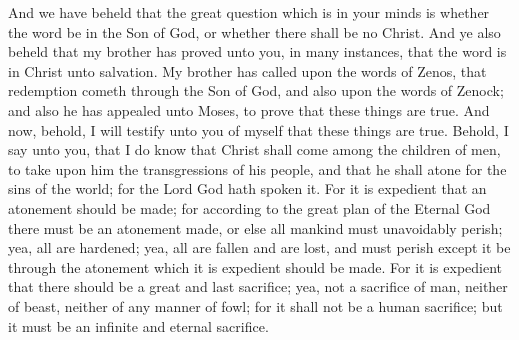 And we have beheld that the great question which is in your minds is whether the word be in the Son of God, or whether there shall be no Christ.
\bverse \iffalse And ye also beheld that my brother has proved unto you, in many instances, that the word is in Christ unto salvation. \fi
And ye also beheld that my brother has proved unto you, in many instances, that the word is in Christ unto salvation.
\bverse \iffalse My brother has called upon the words of Zenos, that redemption cometh through the Son of God, and also upon the words of Zenock; and also he has appealed unto Moses, to prove that these things are true. \fi
My brother has called upon the words of Zenos, that redemption cometh through the Son of God, and also upon the words of Zenock; and also he has appealed unto Moses, to prove that these things are true.
\bverse \iffalse And now, behold, I will testify unto you of myself that these things are true. Behold, I say unto you, that I do know that Christ shall come among the children of men, to take upon him the transgressions of his people, and that he shall atone for the sins of the world; for the Lord God hath spoken it. \fi
And now, behold, I will testify unto you of myself that these things are true. Behold, I say unto you, that I do know that Christ shall come among the children of men, to take upon him the transgressions of his people, and that he shall atone for the sins of the world; for the Lord God hath spoken it.
\bverse \iffalse For it is expedient that an atonement should be made; for according to the great plan of the Eternal God there must be an atonement made, or else all mankind must unavoidably perish; yea, all are hardened; yea, all are fallen and are lost, and must perish except it be through the atonement which it is expedient should be made. \fi
For it is expedient that an atonement should be made; for according to the great plan of the Eternal God there must be an atonement made, or else all mankind must unavoidably perish; yea, all are hardened; yea, all are fallen and are lost, and must perish except it be through the atonement which it is expedient should be made.
\bverse \iffalse For it is expedient that there should be a great and last sacrifice; yea, not a sacrifice of man, neither of beast, neither of any manner of fowl; for it shall not be a human sacrifice; but it must be an infinite and eternal sacrifice. \fi
For it is expedient that there should be a great and last sacrifice; yea, not a sacrifice of man, neither of beast, neither of any manner of fowl; for it shall not be a human sacrifice; but it must be an infinite and eternal sacrifice.
